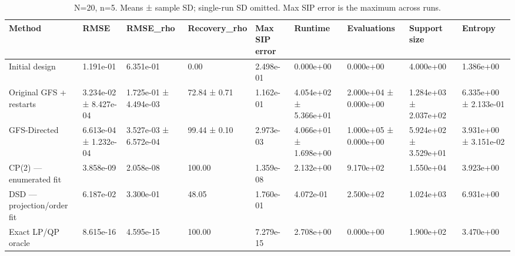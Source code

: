 \begin{table}
\caption{N=20, n=5. Means ± sample SD; single-run SD omitted. Max SIP error is the maximum across runs.}
\begin{tabular}{lllllllll}
\toprule
Method & RMSE & RMSE\_rho & Recovery\_rho & Max SIP error & Runtime & Evaluations & Support size & Entropy \\
\midrule
Initial design & 1.191e-01 & 6.351e-01 & 0.00 & 2.498e-01 & 0.000e+00 & 0.000e+00 & 4.000e+00 & 1.386e+00 \\
Original GFS + restarts & 3.234e-02 ± 8.427e-04 & 1.725e-01 ± 4.494e-03 & 72.84 ± 0.71 & 1.162e-01 & 4.054e+02 ± 5.366e+01 & 2.000e+04 ± 0.000e+00 & 1.284e+03 ± 2.037e+02 & 6.335e+00 ± 2.133e-01 \\
GFS-Directed & 6.613e-04 ± 1.232e-04 & 3.527e-03 ± 6.572e-04 & 99.44 ± 0.10 & 2.973e-03 & 4.066e+01 ± 1.698e+00 & 1.000e+05 ± 0.000e+00 & 5.924e+02 ± 3.529e+01 & 3.931e+00 ± 3.151e-02 \\
CP(2) — enumerated fit & 3.858e-09 & 2.058e-08 & 100.00 & 1.359e-08 & 2.132e+00 & 9.170e+02 & 1.550e+04 & 3.923e+00 \\
DSD — projection/order fit & 6.187e-02 & 3.300e-01 & 48.05 & 1.760e-01 & 4.072e-01 & 2.500e+02 & 1.024e+03 & 6.931e+00 \\
Exact LP/QP oracle & 8.615e-16 & 4.595e-15 & 100.00 & 7.279e-15 & 2.708e+00 & 0.000e+00 & 1.900e+02 & 3.470e+00 \\
\bottomrule
\end{tabular}
\end{table}
